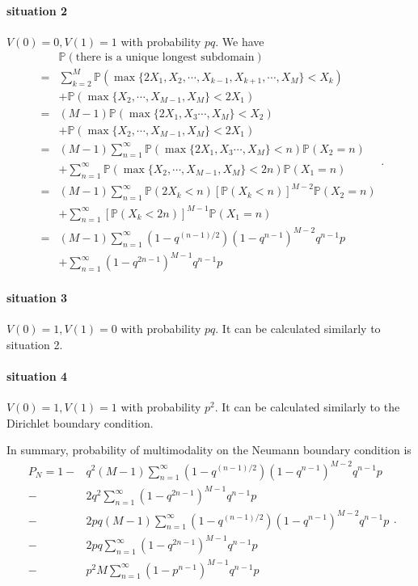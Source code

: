 \documentclass[a4paper,11pt]{article}
\begin{document}
\begin{appendices}
\paragraph*{situation 2}
$V(0) = 0, V(1) = 1$ with probability $p q$. We have
\begin{equation*}
\begin{split}
  & \mathbb{P}(\text{there is a unique longest subdomain}) \\
= & \sum_{k=2}^{M} \mathbb{P}(\max\{2 X_1, X_2, \cdots, X_{k-1}, X_{k+1}, \cdots, X_{M}\} < X_k) \\
& + \mathbb{P}(\max\{X_2, \cdots, X_{M-1}, X_M\} < 2 X_1) \\
= & (M-1) \mathbb{P}(\max\{2 X_1, X_3 \cdots, X_{M}\} < X_2) \\
& + \mathbb{P}(\max\{X_2, \cdots, X_{M-1}, X_M\} < 2 X_1) \\
= & (M-1) \sum_{n=1}^{\infty} \mathbb{P}(\max\{2 X_1, X_3 \cdots, X_{M}\} < n) \mathbb{P}(X_2 = n) \\
& + \sum_{n=1}^{\infty} \mathbb{P}(\max\{X_2, \cdots, X_{M-1}, X_M\} < 2 n) \mathbb{P}(X_1 = n) \\
= & (M-1) \sum_{n=1}^{\infty} \mathbb{P}(2 X_k < n) [\mathbb{P}(X_k < n)]^{M-2} \mathbb{P}(X_2 = n) \\
& + \sum_{n=1}^{\infty} [\mathbb{P}(X_k < 2 n)]^{M-1} \mathbb{P}(X_1 = n) \\
= & (M-1) \sum_{n=1}^{\infty} (1 - q^{(n-1)/2}) (1 - q^{n-1})^{M-2} q^{n-1} p \\
& + \sum_{n=1}^{\infty} (1 - q^{2n-1})^{M-1} q^{n-1} p
\end{split}.
\end{equation*}

\paragraph*{situation 3}
$V(0) = 1, V(1) = 0$ with probability $p q$. It can be calculated similarly to situation 2.

\paragraph*{situation 4}
$V(0) = 1, V(1) = 1$ with probability $p^2$. It can be calculated similarly to the Dirichlet boundary condition.

In summary, probability of multimodality on the Neumann boundary condition is
\begin{equation*}
\begin{split}
P_N = 1 - & q^2 (M-1) \sum_{n=1}^{\infty} (1 - q^{(n-1)/2}) (1 - q^{n-1})^{M-2} q^{n-1} p \\
- & 2 q^2 \sum_{n=1}^{\infty} (1 - q^{2n-1})^{M-1} q^{n-1} p \\
- & 2 p q (M-1) \sum_{n=1}^{\infty} (1 - q^{(n-1)/2}) (1 - q^{n-1})^{M-2} q^{n-1} p \\
- & 2 p q \sum_{n=1}^{\infty} (1 - q^{2n-1})^{M-1} q^{n-1} p \\
- & p^2 M \sum_{n=1}^{\infty} (1 - p^{n-1})^{M-1} q^{n-1} p
\end{split}.
\end{equation*}


\end{appendices}
\end{document}

